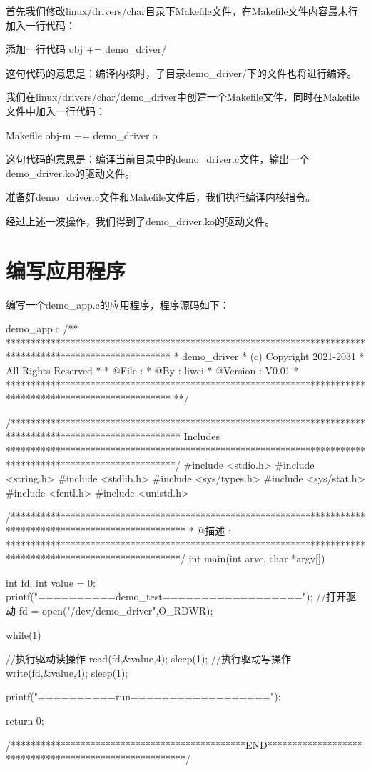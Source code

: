 \documentclass[lang=cn,newtx,10pt,scheme=chinese]{elegantbook}
\begin{document}
首先我们修改linux/drivers/char目录下Makefile文件，在Makefile文件内容最末行加入一行代码：

\begin{mycode}{添加一行代码}
obj += demo_driver/
\end{mycode}

这句代码的意思是：编译内核时，子目录demo\_driver/下的文件也将进行编译。

我们在linux/drivers/char/demo\_driver中创建一个Makefile文件，同时在Makefile文件中加入一行代码：

\begin{mycode}{Makefile}
obj-m += demo_driver.o
\end{mycode}

这句代码的意思是：编译当前目录中的demo\_driver.c文件，输出一个demo\_driver.ko的驱动文件。

准备好demo\_driver.c文件和Makefile文件后，我们执行编译内核指令。

经过上述一波操作，我们得到了demo\_driver.ko的驱动文件。

\section{编写应用程序}

编写一个demo\_app.c的应用程序，程序源码如下：

\begin{mycode}{demo\_app.c}
/**
*********************************************************************************************************
*                                        		demo_driver
*                                      (c) Copyright 2021-2031
*                                         All Rights Reserved
*
* @File    : 
* @By      : liwei
* @Version : V0.01
* 
*********************************************************************************************************
**/

/**********************************************************************************************************
Includes 
**********************************************************************************************************/
#include <stdio.h> 
#include <string.h> 
#include <stdlib.h>
#include <sys/types.h>
#include <sys/stat.h> 
#include <fcntl.h> 
#include <unistd.h>



/***********************************************************************************************************
* @描述	:  
***********************************************************************************************************/
int main(int arvc, char *argv[])
{
	int fd;
	int value = 0;
	printf("==========demo_test==================\n");
	//打开驱动 
	fd = open("/dev/demo_driver",O_RDWR);

	while(1)
	{
		//执行驱动读操作
		read(fd,&value,4);
		sleep(1);
		//执行驱动写操作
		write(fd,&value,4);
		sleep(1);	
		
		printf("==========run==================\n");
	}
	return 0;

}
/***********************************************END*******************************************************/
\end{mycode}
\end{document}

